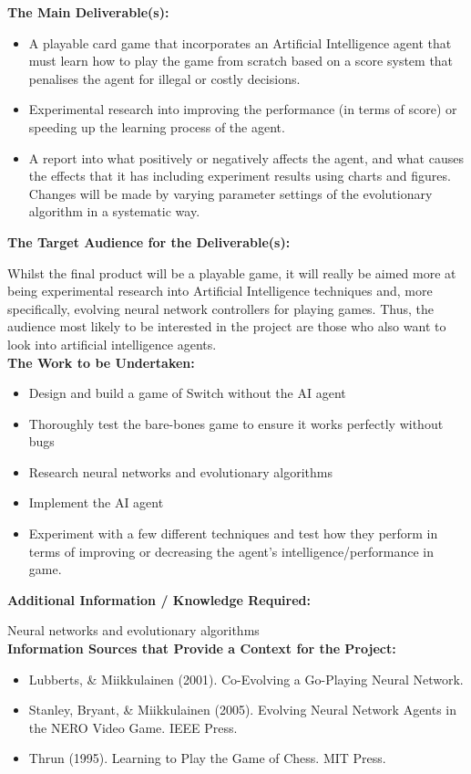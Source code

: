 \documentclass[12pt,a4paper]{article}
\begin{document}
\begin{appendices}
\pagebreak
\large{\textbf{The Main Deliverable(s):}}
\begin{itemize}
	\item A playable card game that incorporates an Artificial Intelligence agent that must learn how to play the game from scratch based on a score system that penalises the agent for illegal or costly decisions. 
	\item Experimental research into improving the performance (in terms of score) or speeding up the learning process of the agent. 
	\item A report into what positively or negatively affects the agent, and what causes the effects that it has including experiment results using charts and figures. Changes will be made by varying parameter settings of the evolutionary algorithm in a systematic way.
\end{itemize}

\large{\textbf{The Target Audience for the Deliverable(s):}}

Whilst the final product will be a playable game, it will really be aimed more at being experimental research into Artificial Intelligence techniques and, more specifically, evolving neural network controllers for playing games. Thus, the audience most likely to be interested in the project are those who also want to look into artificial intelligence agents. \\

\pagebreak
\large{\textbf{The Work to be Undertaken:}}
\begin{itemize}
	\item Design and build a game of Switch without the AI agent
	\item Thoroughly test the bare-bones game to ensure it works perfectly without bugs
	\item Research neural networks and evolutionary algorithms
	\item Implement the AI agent
	\item Experiment with a few different techniques and test how they perform in terms of improving or decreasing the agent’s intelligence/performance in game.
\end{itemize} 

\large{\textbf{Additional Information / Knowledge Required:}}

Neural networks and evolutionary algorithms\\

\large{\textbf{Information Sources that Provide a Context for the Project:}} %
\begin{itemize}
	\item Lubberts, \& Miikkulainen (2001). Co-Evolving a Go-Playing Neural Network.
	\item Stanley, Bryant, \& Miikkulainen (2005). Evolving Neural Network Agents in the NERO Video Game. IEEE Press.
	\item Thrun (1995). Learning to Play the Game of Chess. MIT Press. 
\end{itemize}


\end{appendices}
\end{document}
